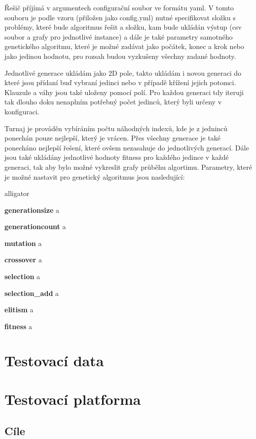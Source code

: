 \documentclass[11pt]{article}
\begin{document}
Řešič příjímá v argumentech configurační soubor ve formátu yaml. V tomto souboru je podle vzoru (přiložen jako config.yml) nutné specifikovat složku s problémy, které bude algoritmus řešit a složku, kam bude ukládán výstup (csv soubor a grafy pro jednotlivé instance) a dále je také parametry samotného genetického algoritmu, které je možné zadávat jako počátek, konec a krok nebo jako jedinou hodnotu, pro rozsah budou vyzkušeny všechny zadané hodnoty. 

Jednotlivé generace ukládám jako 2D pole, takto ukládám i novou generaci do které jsou přídaní buď vybraní jedinci nebo v případě křížení jejich potomci. Klauzule a váhy jsou také uloženy pomocí polí. Pro každou generaci tdy iteruji tak dlouho doku nenaplním potřebný počet jedinců, který byli určeny v konfiguraci.

Turnaj je prováděn vybíráním počtu náhodných indexů, kde je z jedninců ponechán pouze nejlepší, který je vrácen. Přes všechny generace je také ponecháno nejlepší řešení, které ovšem nezasahuje do jednotlivých generací. Dále jsou také ukládány jednotlivé hodnoty fitness pro každého jedince v každé generaci, tak aby bylo možné vykreslit grafy průběhu algortimu. Parametry, které je možné nastavit pro genetický algoritmus jsou nasledující:

\begin{labeling}{alligator}
\item[\textbf{generationsize}] a
\item[\textbf{generationcount}] a
\item[\textbf{mutation}] a
\item[\textbf{crossover}] a
\item[\textbf{selection}] a
\item[\textbf{selection\_add}] a
\item[\textbf{elitism}] a
\item[\textbf{fitness}] a 
\end{labeling}

\section{Testovací data}\label{kap:data}

\section{Testovací platforma}\label{kap:platform}

\subsection{Cíle}\label{kap:cil}
\end{document}

